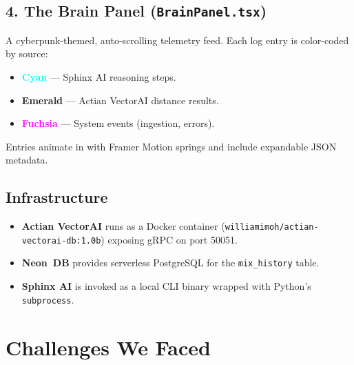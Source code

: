 \documentclass[11pt,a4paper]{article}
\begin{document}
\subsection{4. The Brain Panel (\texttt{BrainPanel.tsx})}
A cyberpunk-themed, auto-scrolling telemetry feed. Each log entry is color-coded by source:
\begin{itemize}[leftmargin=1.5em]
  \item \textcolor{cyan}{\textbf{Cyan}} --- Sphinx AI reasoning steps.
  \item \textcolor{emerald}{\textbf{Emerald}} --- Actian VectorAI distance results.
  \item \textcolor{fuchsia}{\textbf{Fuchsia}} --- System events (ingestion, errors).
\end{itemize}
Entries animate in with Framer Motion springs and include expandable JSON metadata.

\subsection{Infrastructure}
\begin{itemize}[leftmargin=1.5em]
  \item \textbf{Actian VectorAI} runs as a Docker container (\texttt{williamimoh/actian-vectorai-db:1.0b}) exposing gRPC on port 50051.
  \item \textbf{Neon~DB} provides serverless PostgreSQL for the \texttt{mix\_history} table.
  \item \textbf{Sphinx AI} is invoked as a local CLI binary wrapped with Python's \texttt{subprocess}.
\end{itemize}

\section{Challenges We Faced}
\end{document}
